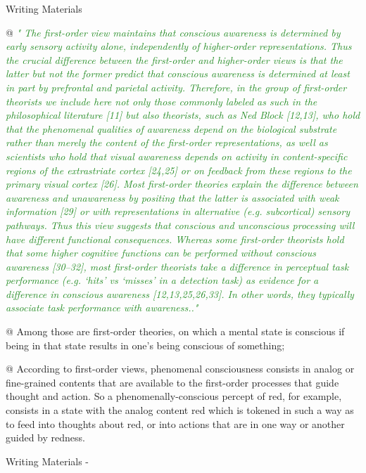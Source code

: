 \documentclass[utf8]{article}
\newenvironment{WritingMaterials} %
    	{
            \begin{tcolorbox}[enhanced,
                title=-,
                size=small,
                colbacktitle=Aquamarine,
                drop fuzzy shadow,
                fontupper=\small,
                boxrule=0.4pt,
                colback=Aquamarine!10!white,
                sharp corners]
                Writing Materials
            \end{tcolorbox}
            \begin{easylist}[itemize]
    	}
    	{
            \end{easylist}  
            \begin{tcolorbox}[enhanced,
                halign=flush right,
                halign title=right,
                size=small,
                colbacktitle=Aquamarine,
                drop fuzzy shadow,
                fontupper=\small,
                boxrule=0.4pt,
                colback=Aquamarine,
                colupper=White,
                sharp corners]
                Writing Materials -
            \end{tcolorbox}        
    	}
\newcommand{\rewrite}[1]{\textcolor{ForestGreen}{\textit{"#1"}}\newline}
\newcommand{\rlend}{\cbend}
\begin{document}
		
			\begin{WritingMaterials}
				@ \rewrite{
					The first-order view maintains that conscious awareness is determined by early sensory activity alone, independently of higher-order representations. Thus the crucial difference between the first-order and higher-order views is that the latter but not the former predict that conscious awareness is determined at least in part by prefrontal and parietal activity. Therefore, in the group of first-order theorists we include here not only those commonly labeled as such in the philosophical literature [11] but also theorists, such as Ned Block [12,13], who hold that the phenomenal qualities of awareness depend on the biological substrate rather than merely the content of the first-order representations, as well as scientists who hold that visual awareness depends on activity in content-specific regions of the extrastriate cortex [24,25] or on feedback from these regions to the primary visual cortex [26]. Most first-order theories explain the difference between awareness and unawareness by positing that the latter is associated with weak information [29] or with representations in alternative (e.g. subcortical) sensory pathways. Thus this view suggests that conscious and unconscious processing will have different functional consequences. Whereas some first-order theorists hold that some higher cognitive functions can be performed without conscious awareness [30–32], most first-order theorists take a difference in perceptual task performance (e.g. ‘hits’ vs ‘misses’ in a detection task) as evidence for a difference in conscious awareness [12,13,25,26,33]. In other words, they typically associate task performance with awareness..} \cite{lau2011empirical}

				@ Among those are first-order theories, on which a mental state is conscious if being in that state results in one's being conscious of something;


				@  According to first-order views, phenomenal consciousness consists in analog or fine-grained contents that are available to the first-order processes that guide thought and action. So a phenomenally-conscious percept of red, for example, consists in a state with the analog content red which is tokened in such a way as to feed into thoughts about red, or into actions that are in one way or another guided by redness.

			\end{WritingMaterials}

\rlend
\end{document}
